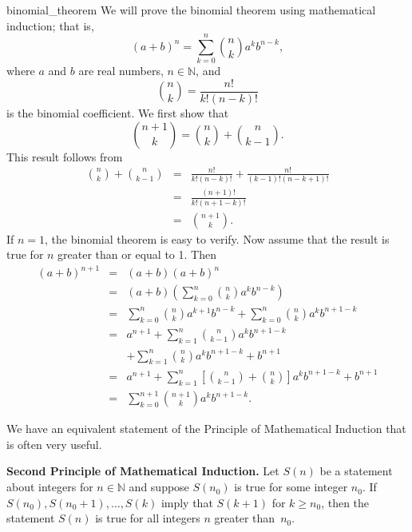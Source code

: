 \begin{example}{binomial_theorem}
We will prove the binomial theorem using mathematical induction; that is, 
\[
(a + b)^n = \sum_{k = 0}^{n} \binom{n}{k} a^k b^{n - k},
\]
where $a$ and $b$ are real numbers, $n \in \mathbb{N}$, and
\[
\binom{n}{k}
= \frac{n!}{k! (n - k)!}\label{factorial}
\]
is the binomial coefficient.\label{binomial}  We first show that
\[
\binom{n + 1}{k}
=
\binom{n}{k} + \binom{n}{k - 1}.
\]
This result follows from
\begin{eqnarray*}
\binom{n}{k} + \binom{n}{k - 1}
& = &
\frac{n!}{k!(n - k)!}
+\frac{n!}{(k-1)!(n - k + 1)!} \\
& = &
\frac{(n + 1)!}{k!(n + 1 - k)!} \\
& = &
\binom{n + 1}{k}.
\end{eqnarray*}
If $n = 1$, the binomial theorem is easy to verify. Now assume that the result is true for $n$ greater than or equal to 1.  Then
\begin{eqnarray*}
(a + b)^{n + 1}
&  = &
(a + b)(a + b)^n \\
& = &
(a + b) 
\left(
\sum_{k = 0}^{n} \binom{n}{k} a^k b^{n - k}
\right) \\
&  = &
\sum_{k = 0}^{n} \binom{n}{k} a^{k + 1} b^{n - k}   +
\sum_{k = 0}^{n} \binom{n}{k} a^k b^{n + 1 - k} \\
&  = &
a^{n + 1} + \sum_{k = 1}^{n} \binom{n}{k - 1} a^{k} b^{n + 1 - k} \\
&  & +
\sum_{k = 1}^{n} \binom{n}{k}  a^k b^{n + 1 - k} + b^{n + 1}\\
&  = &
a^{n + 1} + \sum_{k = 1}^{n} \left[ \binom{n}{k - 1}
+
\binom{n}{k} \right]
a^k b^{n + 1 - k} + b^{n + 1} \\
&  = &
\sum_{k = 0}^{n + 1}   \binom{n + 1}{k} a^k b^{n + 1- k}.
\end{eqnarray*}
\end{example}
 
We have an equivalent statement of the Principle of Mathematical Induction that is often very useful.
 
\medskip

\noindent 
{\bf Second Principle of Mathematical Induction.}  
Let $S(n)$ be a statement about integers for  $n \in {\mathbb N}$ and suppose $S(n_0)$ is true for some integer $n_0$.  If $S(n_0), S(n_0 + 1), \ldots, S(k)$ imply that $S(k + 1)$ for $k \geq n_0$, then the statement $S(n)$ is true for all integers $n$ greater than~$n_0$.   
 
\medskip

